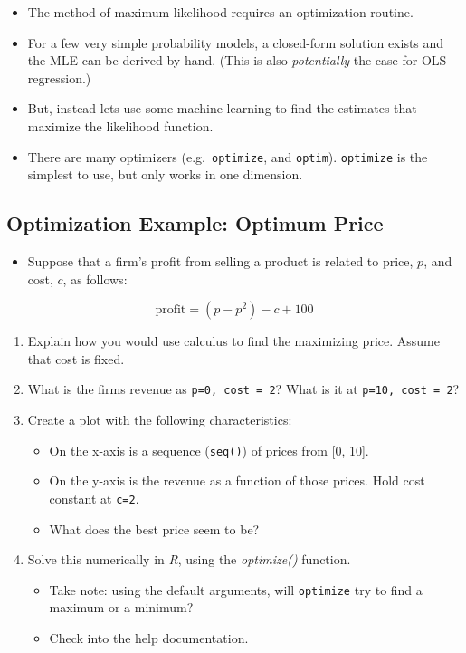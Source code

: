 \documentclass[
]{book}
\providecommand{\tightlist}{%
  \setlength{\itemsep}{0pt}\setlength{\parskip}{0pt}}
\theoremstyle{definition}
\theoremstyle{definition}
\theoremstyle{definition}
\theoremstyle{definition}
\theoremstyle{remark}
\begin{document}
\begin{itemize}
\tightlist
\item
  The method of maximum likelihood requires an optimization routine.
\item
  For a few very simple probability models, a closed-form solution exists and the MLE can be derived by hand. (This is also \emph{potentially} the case for OLS regression.)
\item
  But, instead lets use some machine learning to find the estimates that maximize the likelihood function.
\item
  There are many optimizers (e.g.~\texttt{optimize}, and \texttt{optim}). \texttt{optimize} is the simplest to use, but only works in one dimension.
\end{itemize}

\subsection{Optimization Example: Optimum Price}\label{optimization-example-optimum-price}

\begin{itemize}
\tightlist
\item
  Suppose that a firm's profit from selling a product is related to price, \(p\), and cost, \(c\), as follows:
\end{itemize}

\[ 
\text{profit} = (p - p^2) - c + 100
\]

\begin{enumerate}
\def\labelenumi{\arabic{enumi}.}
\item
  Explain how you would use calculus to find the maximizing price. Assume that cost is fixed.
\item
  What is the firms revenue as \texttt{p=0,\ cost\ =\ 2}? What is it at \texttt{p=10,\ cost\ =\ 2}?
\item
  Create a plot with the following characteristics:

  \begin{itemize}
  \tightlist
  \item
    On the x-axis is a sequence (\texttt{seq()}) of prices from {[}0, 10{]}.
  \item
    On the y-axis is the revenue as a function of those prices. Hold cost constant at \texttt{c=2}.\\
  \item
    What does the best price seem to be?
  \end{itemize}
\item
  Solve this numerically in \emph{R}, using the \emph{optimize()} function.

  \begin{itemize}
  \tightlist
  \item
    Take note: using the default arguments, will \texttt{optimize} try to find a maximum or a minimum?
  \item
    Check into the help documentation.
  \end{itemize}
\end{enumerate}
\end{document}
